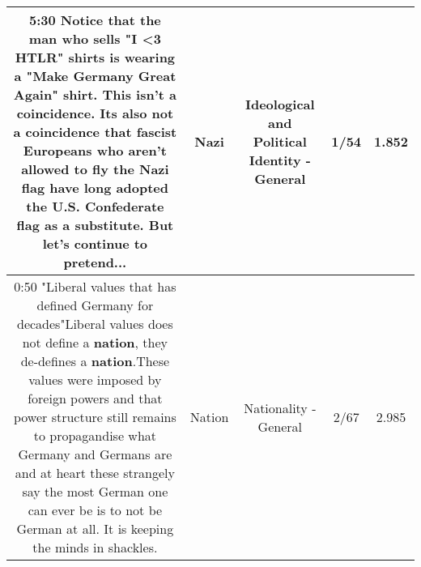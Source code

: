 \documentclass[11pt]{article}
\newlength\mylength
\begin{document}
\begin{center}
\begin{longtable}{|C{.65\mylength}|C{.30\mylength}|C{.12\mylength}|C{.12\mylength}|C{.12\mylength}|}
  \small 5:30 Notice that the man who sells "I <3 HTLR" shirts is wearing a "Make Germany Great Again" shirt. This isn't a coincidence. Its also not a coincidence that fascist Europeans who aren't allowed to fly the \textbf{Nazi} flag have long adopted the U.S. Confederate flag as a substitute. But let's continue to pretend...\normalsize   & Nazi &  Ideological and Political Identity - General & 1/54 & 1.852 \\  \hline
  \small 0:50 "Liberal values that has defined Germany for decades"Liberal values does not define a \textbf{nation}, they de-defines a \textbf{nation}.These values were imposed by foreign powers and that power structure still remains to propagandise what Germany and Germans are and at heart these strangely say the most German one can ever be is to not be German at all. It is keeping the minds in shackles.\normalsize   & Nation & Nationality - General & 2/67 & 2.985 \\  \hline

\end{longtable}
\end{center}
\end{document}
